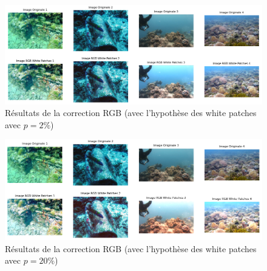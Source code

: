 \documentclass[10pt, a4paper]{extarticle}
\numberwithin{equation}{section}
\numberwithin{figure}{section}
\begin{document}
\begin{figure}[h!]
\begin{center}
\includegraphics[width=18cm]{image005.png}
\end{center}
\label{figure2.2}
\caption{Résultats de la correction RGB (avec l'hypothèse des white patches avec $p=2\%$) }
\end{figure} 

\begin{figure}[h!]
\begin{center}
\includegraphics[width=18cm]{image010.png}
\end{center}
\label{figure2.3}
\caption{Résultats de la correction RGB (avec l'hypothèse des white patches avec $p=20\%$) }
\end{figure}
\end{document}
